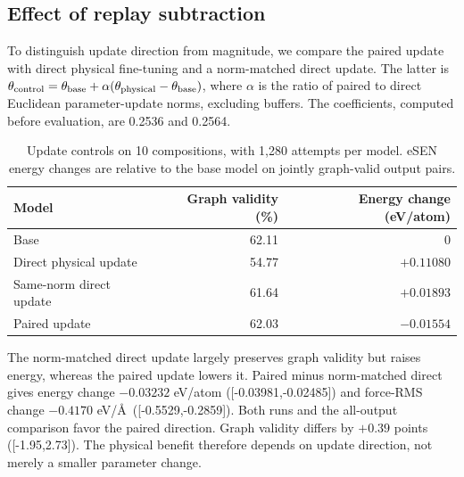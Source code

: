 \subsection{Effect of replay subtraction}\label{sec:update-ablation}
To distinguish update direction from magnitude, we compare the paired update with direct physical fine-tuning and a norm-matched direct update. The latter is $\theta_{\rm control}=\theta_{\rm base}+\alpha(\theta_{\rm physical}-\theta_{\rm base})$, where $\alpha$ is the ratio of paired to direct Euclidean parameter-update norms, excluding buffers. The coefficients, computed before evaluation, are 0.2536 and 0.2564.

\begin{table}[t]
\centering
\caption{Update controls on 10 compositions, with 1,280 attempts per model. eSEN energy changes are relative to the base model on jointly graph-valid output pairs.}
\small
\begin{tabular}{lrr}
\toprule
Model & Graph validity (\%) & Energy change (eV/atom)\\
\midrule
Base &62.11&0\\
Direct physical update &54.77&$+0.11080$\\
Same-norm direct update &61.64&$+0.01893$\\
Paired update &62.03&$-0.01554$\\
\bottomrule
\end{tabular}\label{tab:update-ablation}
\end{table}

The norm-matched direct update largely preserves graph validity but raises energy, whereas the paired update lowers it. Paired minus norm-matched direct gives energy change $-0.03232$ eV/atom ([-0.03981,-0.02485]) and force-RMS change $-0.4170$ eV/\AA\ ([-0.5529,-0.2859]). Both runs and the all-output comparison favor the paired direction. Graph validity differs by $+0.39$ points ([-1.95,2.73]). The physical benefit therefore depends on update direction, not merely a smaller parameter change.
